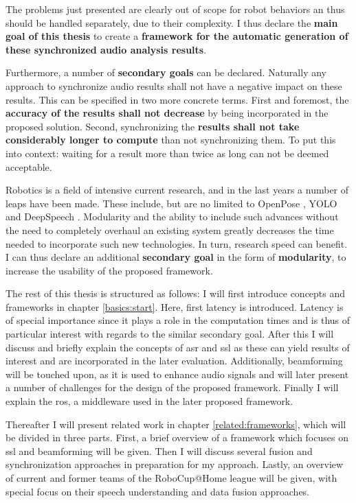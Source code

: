 The problems just presented are clearly out of scope for robot behaviors an thus should be handled separately, due to their complexity.
I thus declare the \textbf{main goal of this thesis} to create a \textbf{framework for the automatic generation of these synchronized audio analysis results}.

Furthermore, a number of \textbf{secondary goals} can be declared.
Naturally any approach to synchronize audio results shall not have a negative impact on these results.
This can be specified in two more concrete terms.
First and foremost, the \textbf{accuracy of the results shall not decrease} by being incorporated in the proposed solution.
Second, synchronizing the \textbf{results shall not take considerably longer to compute} than not synchronizing them.
To put this into context: waiting for a result more than twice as long can not be deemed acceptable.


Robotics is a field of intensive current research, and in the last years a number of leaps have been made.
These include, but are no limited to OpenPose \cite{cao2018openpose}, YOLO \cite{yolov3} and DeepSpeech \cite{deepspeech}.
Modularity and the ability to include such advances without the need to completely overhaul an existing system greatly decreases the time needed to incorporate such new technologies.
In turn, research speed can benefit.
I can thus declare an additional \textbf{secondary goal} in the form of \textbf{modularity}, to increase the usability of the proposed framework.


The rest of this thesis is structured as follows:
I will first introduce concepts and frameworks in chapter \ref{basics:start}.
Here, first latency is introduced.
Latency is of special importance since it  plays a role in the computation times and is thus of particular interest with regards to the similar secondary goal.
After this I will discuss and briefly explain the concepts of \gls{asr} and \gls{ssl} as these can yield results of interest and are incorporated in the later evaluation.
Additionally, beamforming will be touched upon, as it is used to enhance audio signals and will later present a number of challenges for the design of the proposed framework.
Finally I will explain the \gls{ros}, a middleware used in the later proposed framework.

Thereafter I will present related work in chapter \ref{related:frameworks}, which will be divided in three parts.
First, a brief overview of a framework which focuses on \gls{ssl} and beamforming will be given.
Then I will discuss several fusion and synchronization approaches in preparation for my approach.
Lastly, an overview of current and former teams of the RoboCup@Home league will be given, with special focus on their speech understanding and data fusion approaches.

